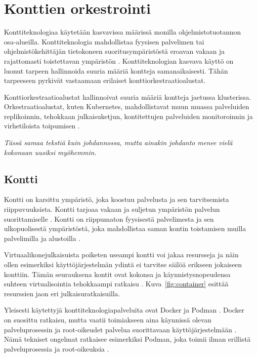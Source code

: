 \chapter{Konttien orkestrointi\label{orchestration}}

Konttiteknologiaa käytetään kasvavissa määrissä monilla ohjelmistotuotannon osa-alueilla.
Konttiteknologia mahdollistaa fyysisen palvelimen tai ohjelmistökehittäjän tietokoneen suoritusympäristöstä eroavan vakaan ja rajattomasti toistettavan ympäristön \cite{Watada19}.
Konttiteknologian kasvava käyttö on luonut tarpeen hallinnoida suuria määriä kontteja samanaikaisesti.
Tähän tarpeeseen pyrkivät vastaamaan erilaiset konttiorkestraatioalustat.

Konttiorkestraatioalustat hallinnoivat suuria määriä kontteja jaetussa klusterissa.
Orkestraatioalustat, kuten Kubernetes, mahdollistavat muun muassa palveluiden replikoinnin, tehokkaan julkaisuketjun, kontitettujen palveluiden monitoroinnin ja virhetiloista toipumisen \cite{Khan17}.

\textit{Tässä samaa tekstiä kuin johdannossa, mutta ainakin johdanto menee vielä kokonaan uusiksi myöhemmin.}

\section{Kontti}

Kontti on karsittu ympäristö, joka koostuu palvelusta ja sen tarvitsemista riippuvuuksista.
Kontti tarjoaa vakaan ja suljetun ympäristön palvelun suorittamiselle \cite{Watada19}.
Kontti on riippumaton fyysisestä palvelimesta ja sen ulkopuolisestä ympäristöstä, joka mahdollistaa saman kontin toistamisen muilla palvelimilla ja alustoilla \cite{Saha18}.

Virtuaalikonejulkaisuista poiketen useampi kontti voi jakaa resursseja ja näin ollen esimerkiksi käyttöjärjestelmän ydintä ei tarvitse säilöä erikseen jokaiseen konttiin.
Tämän seurauksena kontit ovat kokonsa ja käynnistysnopeudensa suhteen virtualisointia tehokkaampi ratkaisu \cite{Dua14}.
Kuva~\ref{fig:container} esittää resurssien jaon eri julkaisuratkaisuilla.

Yleisesti käytettyjä konttiteknologiapalveluita ovat Docker ja Podman \cite{Abraham20, Bernstein14}.
Docker on suosittu ratkaisu, mutta vaatii toimiakseen aina käynnissä olevan palveluprosessin ja root-oikeudet palvelua suorittavaan käyttöjärjestelmään \cite{Abraham20}.
Nämä tekniset ongelmat ratkaisee esimerkiksi Podman, joka toimii ilman erillistä palveluprosessia ja root-oikeuksia \cite{Gantikow20}.

